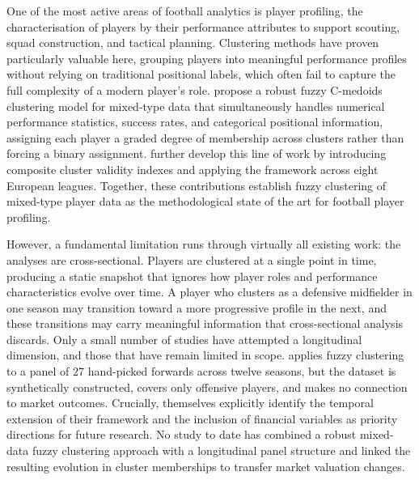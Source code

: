 \documentclass[a4paper,11pt]{report}
\begin{document}
One of the most active areas of football analytics is player profiling, the characterisation of players by their performance attributes to support scouting, squad construction, and tactical planning. Clustering methods have proven particularly valuable here, grouping players into meaningful performance profiles without relying on traditional positional labels, which often fail to capture the full complexity of a modern player's role. \cite{durso2022robust} propose a robust fuzzy C-medoids clustering model for mixed-type data that simultaneously handles numerical performance statistics, success rates, and categorical positional information, assigning each player a graded degree of membership across clusters rather than forcing a binary assignment. \cite{akhanli2023clustering} further develop this line of work by introducing composite cluster validity indexes and applying the framework across eight European leagues. Together, these contributions establish fuzzy clustering of mixed-type player data as the methodological state of the art for football player profiling.

However, a fundamental limitation runs through virtually all existing work: the analyses are cross-sectional. Players are clustered at a single point in time, producing a static snapshot that ignores how player roles and performance characteristics evolve over time. A player who clusters as a defensive midfielder in one season may transition toward a more progressive profile in the next, and these transitions may carry meaningful information that cross-sectional analysis discards. Only a small number of studies have attempted a longitudinal dimension, and those that have remain limited in scope. \cite{pacifico2025fuzzy} applies fuzzy clustering to a panel of 27 hand-picked forwards across twelve seasons, but the dataset is synthetically constructed, covers only offensive players, and makes no connection to market outcomes. Crucially, \cite{durso2022robust} themselves explicitly identify the temporal extension of their framework and the inclusion of financial variables as priority directions for future research. No study to date has combined a robust mixed-data fuzzy clustering approach with a longitudinal panel structure and linked the resulting evolution in cluster memberships to transfer market valuation changes.
\end{document}
